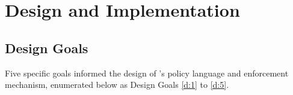 \section{\bpfcontain{} Design and Implementation}
\label{sec:design}


\subsection{Design Goals}

Five specific goals informed the design of \bpfcontain{}'s policy language and
enforcement mechanism, enumerated below as Design Goals \ref{d:1} to \ref{d:5}.

